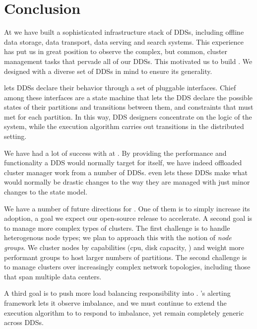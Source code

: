 \section{Conclusion}
\label{sec:conclusion}
%
At \linkedin we have built a sophisticated infrastructure stack of DDSs, including
offline data storage, data transport, data serving and search systems.  This
experience has put us in great position to observe the complex, but common,
cluster management tasks that pervade all of our DDSs.  This motivated us to
build \helix.  We designed \helix with a diverse set of DDSs in mind to ensure
its generality.

\helix lets DDSs declare their behavior through a set of pluggable interfaces.
Chief among these interfaces are a state machine that lets the DDS declare the
possible states of their partitions and transitions between them, and constraints 
that must met for each partition.  In this way, DDS designers concentrate on
the logic of the system, while the \helix execution algorithm carries out transitions in the distributed
setting.  

We have had a lot of success with \helix at \linkedin.  By providing the
performance and functionality a DDS would normally target for itself, we have indeed
offloaded cluster manager work from a number of DDSs.  \helix even lets these DDSs
make what would normally be drastic changes to the way they are managed with
just minor changes to the \helix state model.    

We have a number of future directions for \helix.  One of them is to simply
increase its adoption, a goal we expect our open-source release to accelerate.
A second goal is to manage more complex types of clusters.  The first challenge
is to handle heterogenous node types; we plan to approach this with the notion
of \emph{node groups}.  We cluster nodes by capabilities (cpu, disk capacity,
\etc) and weight more performant groups to host larger numbers of partitions. 
The second challenge is to manage clusters over increasingly complex network
topologies, including those that span multiple data centers.  

A third goal is to push more load balancing responsibility into \helix.  \helix's
alerting framework lets it observe imbalance, and we must continue to extend the
\helix execution algorithm to to respond to imbalance, yet remain completely
generic across DDSs. 

